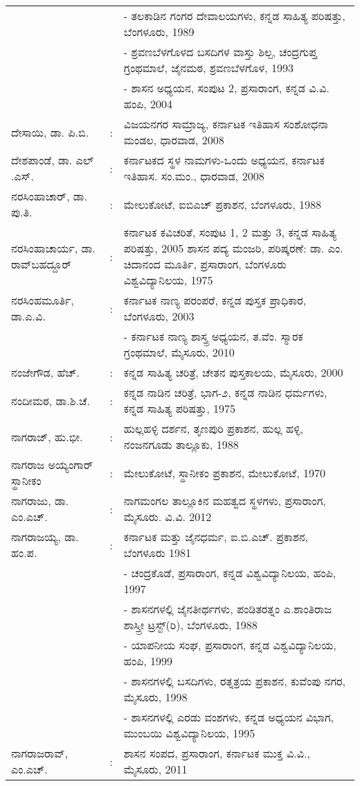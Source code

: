 \begin{longtable}[l]{@{}>{\raggedright}p{4.7cm}cp{9.2cm}<{\raggedright}@{}}
&& - ತಲಕಾಡಿನ ಗಂಗರ ದೇವಾಲಯಗಳು, ಕನ್ನಡ ಸಾಹಿತ್ಯ ಪರಿಷತ್ತು, ಬೆಂಗಳೂರು, 1989\\
&& - ಶ್ರವಣಬೆಳಗೊಳದ ಬಸದಿಗಳ ವಾಸ್ತು ಶಿಲ್ಪ, ಚಂದ್ರಗುಪ್ತ ಗ್ರಂಥಮಾಲೆ, ಜೈನಮಠ, ಶ್ರವಣಬೆಳಗೊಳ, 1993\\
&& - ಶಾಸನ ಅಧ್ಯಯನ, ಸಂಪುಟ 2, ಪ್ರಸಾರಾಂಗ, ಕನ್ನಡ ವಿ.ವಿ. ಹಂಪಿ, 2004\\
ದೇಸಾಯಿ, ಡಾ. ಪಿ.ಬಿ. & : & ವಿಜಯನಗರ ಸಾಮ್ರಾಜ್ಯ, ಕರ್ನಾಟಕ ಇತಿಹಾಸ ಸಂಶೋಧನಾ ಮಂಡಲ, ಧಾರವಾಡ, 2008\\
ದೇಶಪಾಂಡೆ, ಡಾ. ಎಲ್​.ಎಸ್​. & : &  ಕರ್ನಾಟಕದ ಸ್ಥಳ ನಾಮಗಳು-ಒಂದು ಅಧ್ಯಯನ, ಕರ್ನಾಟಕ ಇತಿಹಾಸ. ಸಂ.ಮಂ., ಧಾರವಾಡ, 2008\\
ನರಸಿಂಹಾಚಾರ್​, ಡಾ. ಪು.ತಿ. & : &  ಮೇಲುಕೋಟೆ, ಐಬಿಎಚ್​ ಪ್ರಕಾಶನ, ಬೆಂಗಳೂರು, 1988\\
ನರಸಿಂಹಾಚಾರ್ಯ, ಡಾ. ರಾವ್​ಬಹದ್ದೂರ್​ & : &  ಕರ್ನಾಟಕ ಕವಿಚರಿತೆ, ಸಂಪುಟ 1, 2 ಮತ್ತು 3, ಕನ್ನಡ ಸಾಹಿತ್ಯ ಪರಿಷತ್ತು, 2005 ಶಾಸನ ಪದ್ಯ ಮಂಜರಿ, ಪರಿಷ್ಕರಣೆ: ಡಾ. ಎಂ. ಚಿದಾನಂದ ಮೂರ್ತಿ, ಪ್ರಸಾರಾಂಗ, ಬೆಂಗಳೂರು ವಿಶ್ವವಿದ್ಯಾನಿಲಯ, 1975\\
ನರಸಿಂಹಮೂರ್ತಿ, ಡಾ.ಎ.ವಿ. & : & ಕರ್ನಾಟಕ ನಾಣ್ಯ ಪರಂಪರೆ, ಕನ್ನಡ ಪುಸ್ತಕ ಪ್ರಾಧಿಕಾರ, ಬೆಂಗಳೂರು, 2003\\
&& - ಕರ್ನಾಟಕ ನಾಣ್ಯ ಶಾಸ್ತ್ರ ಅಧ್ಯಯನ, ತ.ವೆಂ. ಸ್ಮಾರಕ ಗ್ರಂಥಮಾಲೆ, ಮೈಸೂರು, 2010\\
ನಂಜೇಗೌಡ, ಹೆಚ್​. & : & ಕನ್ನಡ ಸಾಹಿತ್ಯ ಚರಿತ್ರೆ, ಚೇತನ ಪುಸ್ತಕಾಲಯ, ಮೈಸೂರು, 2000\\
ನಂದೀಮಠ, ಡಾ.ಶಿ.ಚೆ. & : &  ಕನ್ನಡ ನಾಡಿನ ಚರಿತ್ರೆ, ಭಾಗ-೨, ಕನ್ನಡ ನಾಡಿನ ಧರ್ಮಗಳು, ಕನ್ನಡ ಸಾಹಿತ್ಯ ಪರಿಷತ್ತು, 1975\\
ನಾಗರಾಜ್​, ಹು.ಭೀ. & : & ಹುಲ್ಲಹಳ್ಳಿ ದರ್ಶನ, ತೃಣಪುರಿ ಪ್ರಕಾಶನ, ಹುಲ್ಲ ಹಳ್ಳಿ, ನಂಜನಗೂಡು ತಾಲ್ಲೂಕು, 1988\\
ನಾಗರಾಜ ಅಯ್ಯಂಗಾರ್​ ಸ್ಥಾನೀಕಂ & : &  ಮೇಲುಕೋಟೆ, ಸ್ಥಾನೀಕಂ ಪ್ರಕಾಶನ, ಮೇಲುಕೋಟೆ, 1970\\
ನಾಗರಾಜು, ಡಾ. ಎಂ.ಎಚ್​. & : & ನಾಗಮಂಗಲ ತಾಲ್ಲೂಕಿನ ಮಹತ್ವದ ಸ್ಥಳಗಳು, ಪ್ರಸಾರಾಂಗ, ಮೈಸೂರು. ವಿ.ವಿ. 2012\\
ನಾಗರಾಜಯ್ಯ, ಡಾ. ಹಂ.ಪ. & : &  ಕರ್ನಾಟಕ ಮತ್ತು ಜೈನಧರ್ಮ, ಐ.ಬಿ.ಎಚ್​. ಪ್ರಕಾಶನ, ಬೆಂಗಳೂರು 1981\\
&& - ಚಂದ್ರಕೊಡೆ, ಪ್ರಸಾರಾಂಗ, ಕನ್ನಡ ವಿಶ್ವವಿದ್ಯಾನಿಲಯ, ಹಂಪಿ, 1997\\
&& - ಶಾಸನಗಳಲ್ಲಿ ಜೈನತೀರ್ಥಗಳು, ಪಂಡಿತರತ್ನಂ ಎ.ಶಾಂತಿರಾಜ ಶಾಸ್ತ್ರೀ ಟ್ರಸ್ಟ್​(ರಿ), ಬೆಂಗಳೂರು, 1988\\
&& - ಯಾಪನೀಯ ಸಂಘ, ಪ್ರಸಾರಾಂಗ, ಕನ್ನಡ ವಿಶ್ವವಿದ್ಯಾನಿಲಯ, ಹಂಪಿ, 1999\\
&& - ಶಾಸನಗಳಲ್ಲಿ ಬಸದಿಗಳು, ರತ್ನತ್ರಯ ಪ್ರಕಾಶನ, ಕುವೆಂಪು ನಗರ, ಮೈಸೂರು, 1998\\
&& - ಶಾಸನಗಳಲ್ಲಿ ಎರಡು ವಂಶಗಳು, ಕನ್ನಡ ಅಧ್ಯಯನ ವಿಭಾಗ, ಮುಂಬಯಿ ವಿಶ್ವವಿದ್ಯಾನಿಲಯ, 1995\\
ನಾಗರಾಜರಾವ್​, ಎಂ.ಎಚ್​. & : &  ಶಾಸನ ಸಂಪದ, ಪ್ರಸಾರಾಂಗ, ಕರ್ನಾಟಕ ಮುಕ್ತ ವಿ.ವಿ., ಮೈಸೂರು, 2011\\

\end{longtable}
